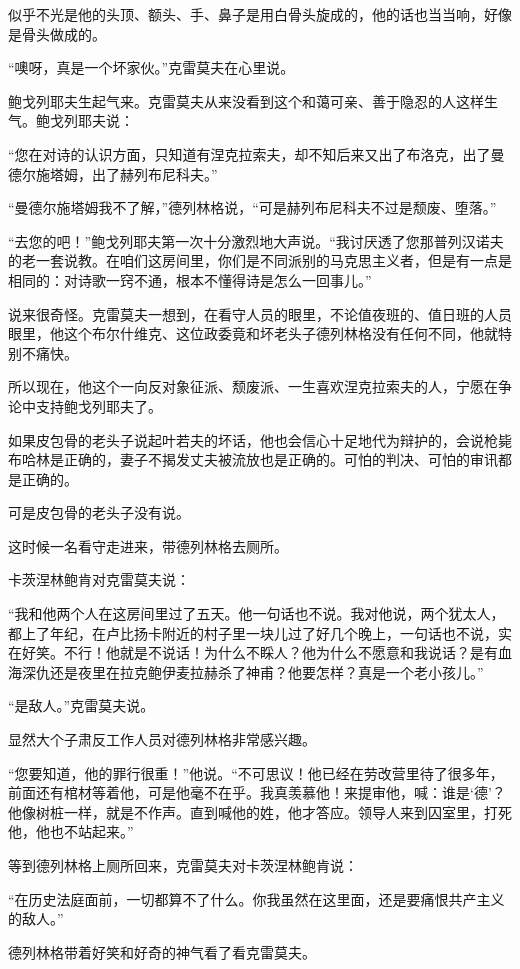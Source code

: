 似乎不光是他的头顶、额头、手、鼻子是用白骨头旋成的，他的话也当当响，好像是骨头做成的。

“噢呀，真是一个坏家伙。”克雷莫夫在心里说。

鲍戈列耶夫生起气来。克雷莫夫从来没看到这个和蔼可亲、善于隐忍的人这样生气。鲍戈列耶夫说：

“您在对诗的认识方面，只知道有涅克拉索夫，却不知后来又出了布洛克，出了曼德尔施塔姆，出了赫列布尼科夫。”

“曼德尔施塔姆我不了解，”德列林格说，“可是赫列布尼科夫不过是颓废、堕落。”

“去您的吧！”鲍戈列耶夫第一次十分激烈地大声说。“我讨厌透了您那普列汉诺夫的老一套说教。在咱们这房间里，你们是不同派别的马克思主义者，但是有一点是相同的：对诗歌一窍不通，根本不懂得诗是怎么一回事儿。”

说来很奇怪。克雷莫夫一想到，在看守人员的眼里，不论值夜班的、值日班的人员眼里，他这个布尔什维克、这位政委竟和坏老头子德列林格没有任何不同，他就特别不痛快。

所以现在，他这个一向反对象征派、颓废派、一生喜欢涅克拉索夫的人，宁愿在争论中支持鲍戈列耶夫了。

如果皮包骨的老头子说起叶若夫的坏话，他也会信心十足地代为辩护的，会说枪毙布哈林是正确的，妻子不揭发丈夫被流放也是正确的。可怕的判决、可怕的审讯都是正确的。

可是皮包骨的老头子没有说。

这时候一名看守走进来，带德列林格去厕所。

卡茨涅林鲍肯对克雷莫夫说：

“我和他两个人在这房间里过了五天。他一句话也不说。我对他说，两个犹太人，都上了年纪，在卢比扬卡附近的村子里一块儿过了好几个晚上，一句话也不说，实在好笑。不行！他就是不说话！为什么不睬人？他为什么不愿意和我说话？是有血海深仇还是夜里在拉克鲍伊麦拉赫杀了神甫？他要怎样？真是一个老小孩儿。”

“是敌人。”克雷莫夫说。

显然大个子肃反工作人员对德列林格非常感兴趣。

“您要知道，他的罪行很重！”他说。“不可思议！他已经在劳改营里待了很多年，前面还有棺材等着他，可是他毫不在乎。我真羡慕他！来提审他，喊：谁是‘德’？他像树桩一样，就是不作声。直到喊他的姓，他才答应。领导人来到囚室里，打死他，他也不站起来。”

等到德列林格上厕所回来，克雷莫夫对卡茨涅林鲍肯说：

“在历史法庭面前，一切都算不了什么。你我虽然在这里面，还是要痛恨共产主义的敌人。”

德列林格带着好笑和好奇的神气看了看克雷莫夫。

